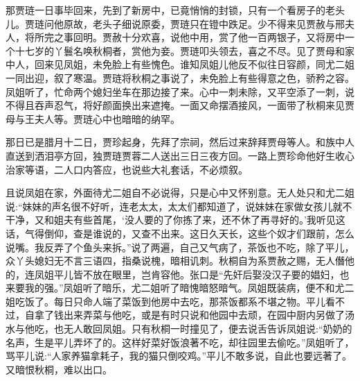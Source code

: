 \begin{parag}
    那贾琏一日事毕回来，先到了新房中，已竟悄悄的封锁，只有一个看房子的老头儿。贾琏问他原故，老头子细说原委，贾琏只在镫中跌足。少不得来见贾赦与邢夫人，将所完之事回明。贾赦十分欢喜，说他中用，赏了他一百两银子，又将房中一个十七岁的丫鬟名唤秋桐者，赏他为妾。贾琏叩头领去，喜之不尽。见了贾母和家中人，回来见凤姐，未免脸上有些愧色。谁知凤姐儿他反不似往日容颜，同尤二姐一同出迎，叙了寒温。贾琏将秋桐之事说了，未免脸上有些得意之色，骄矜之容。凤姐听了，忙命两个媳妇坐车在那边接了来。心中一刺未除，又平空添了一刺，说不得且吞声忍气，将好颜面换出来遮掩。一面又命摆酒接风，一面带了秋桐来见贾母与王夫人等。贾琏心中也暗暗的纳罕。
\end{parag}


\begin{parag}
    那日已是腊月十二日，贾珍起身，先拜了宗祠，然后过来辞拜贾母等人。和族中人直送到洒泪亭方回，独贾琏贾蓉二人送出三日三夜方回。一路上贾珍命他好生收心治家等语，二人口内答应，也说些大礼套话，不必烦叙。
\end{parag}


\begin{parag}
    且说凤姐在家，外面待尤二姐自不必说得，只是心中又怀别意。无人处只和尤二姐说:“妹妹的声名很不好听，连老太太，太太们都知道了，说妹妹在家做女孩儿就不干净，又和姐夫有些首尾，‘没人要的了你拣了来，还不休了再寻好的。’我听见这话，气得倒仰，查是谁说的，又查不出来。这日久天长，这些个奴才们跟前，怎么说嘴。我反弄了个鱼头来拆。”说了两遍，自己又气病了，茶饭也不吃，除了平儿，众丫头媳妇无不言三语四，指桑说槐，暗相讥刺。秋桐自为系贾赦之赐，无人僭他的，连凤姐平儿皆不放在眼里，岂肯容他。张口是“先奸后娶没汉子要的娼妇，也来要我的强。”凤姐听了暗乐，尤二姐听了暗愧暗怒暗气。凤姐既装病，便不和尤二姐吃饭了。每日只命人端了菜饭到他房中去吃，那茶饭都系不堪之物。平儿看不过，自拿了钱出来弄菜与他吃，或是有时只说和他园中去顽，在园中厨内另做了汤水与他吃，也无人敢回凤姐。只有秋桐一时撞见了，便去说舌告诉凤姐说:“奶奶的名声，生是平儿弄坏了的。这样好菜好饭浪著不吃，却往园里去偷吃。”凤姐听了，骂平儿说:“人家养猫拿耗子，我的猫只倒咬鸡。”平儿不敢多说，自此也要远著了。又暗恨秋桐，难以出口。
\end{parag}


